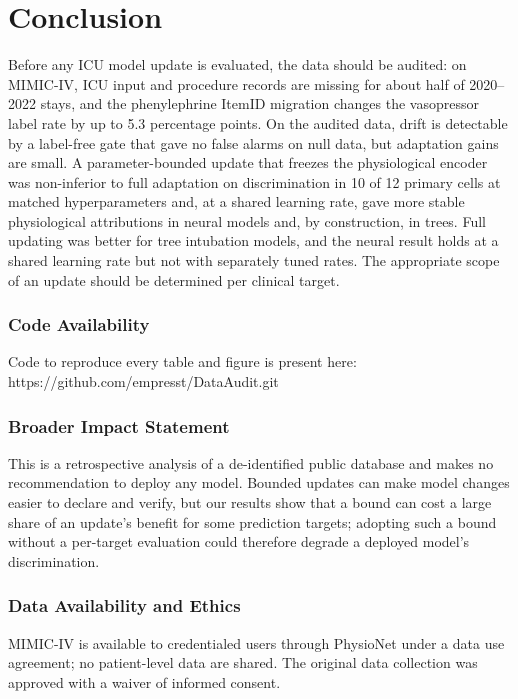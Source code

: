 \documentclass[10pt,a4paper,twocolumn]{article}
\begin{document}
	\section{Conclusion}
	Before any ICU model update is evaluated, the data should be audited: on MIMIC-IV, ICU input and procedure records are missing for about half of 2020--2022 stays, and the phenylephrine ItemID migration changes the vasopressor label rate by up to 5.3 percentage points. On the audited data, drift is detectable by a label-free gate that gave no false alarms on null data, but adaptation gains are small. A parameter-bounded update that freezes the physiological encoder was non-inferior to full adaptation on discrimination in 10 of 12 primary cells at matched hyperparameters and, at a shared learning rate, gave more stable physiological attributions in neural models and, by construction, in trees. Full updating was better for tree intubation models, and the neural result holds at a shared learning rate but not with separately tuned rates. The appropriate scope of an update should be determined per clinical target.
	
	
	\subsubsection*{Code Availability}
	Code to reproduce every table and figure is present here: https://github.com/empresst/DataAudit.git
	\subsubsection*{Broader Impact Statement}
	This is a retrospective analysis of a de-identified public database and makes no
	recommendation to deploy any model. Bounded updates can make model changes easier
	to declare and verify, but our results show that a bound can cost a large share of
	an update's benefit for some prediction targets; adopting such a bound without a
	per-target evaluation could therefore degrade a deployed model's discrimination.
	
	\subsubsection*{Data Availability and Ethics}
	MIMIC-IV is available to credentialed users through PhysioNet under a data use
	agreement; no patient-level data are shared. The original data collection was
	approved with a waiver of informed consent.
	
\end{document}
